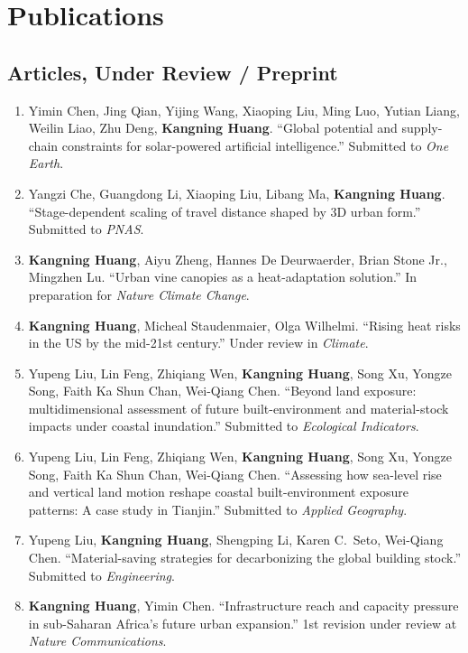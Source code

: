 \documentclass[11pt,letterpaper]{article}
\begin{document}
\section{Publications}

\subsection{Articles, Under Review / Preprint}
\begin{enumerate}
  \item Yimin Chen, Jing Qian, Yijing Wang, Xiaoping Liu, Ming Luo, Yutian Liang, Weilin Liao, Zhu Deng, \textbf{Kangning Huang}. ``Global potential and supply-chain constraints for solar-powered artificial intelligence.'' Submitted to \textit{One Earth}.
  \item Yangzi Che, Guangdong Li, Xiaoping Liu, Libang Ma, \textbf{Kangning Huang}. ``Stage-dependent scaling of travel distance shaped by 3D urban form.'' Submitted to \textit{PNAS}.
  \item \textbf{Kangning Huang}, Aiyu Zheng, Hannes De Deurwaerder, Brian Stone Jr., Mingzhen Lu. ``Urban vine canopies as a heat-adaptation solution.'' In preparation for \textit{Nature Climate Change}.
  \item \textbf{Kangning Huang}, Micheal Staudenmaier, Olga Wilhelmi. ``Rising heat risks in the US by the mid-21st century.'' Under review in \textit{Climate}.
  \item Yupeng Liu, Lin Feng, Zhiqiang Wen, \textbf{Kangning Huang}, Song Xu, Yongze Song, Faith Ka Shun Chan, Wei-Qiang Chen. ``Beyond land exposure: multidimensional assessment of future built-environment and material-stock impacts under coastal inundation.'' Submitted to \textit{Ecological Indicators}.
  \item Yupeng Liu, Lin Feng, Zhiqiang Wen, \textbf{Kangning Huang}, Song Xu, Yongze Song, Faith Ka Shun Chan, Wei-Qiang Chen. ``Assessing how sea-level rise and vertical land motion reshape coastal built-environment exposure patterns: A case study in Tianjin.'' Submitted to \textit{Applied Geography}.
  \item Yupeng Liu, \textbf{Kangning Huang}, Shengping Li, Karen C.\ Seto, Wei-Qiang Chen. ``Material-saving strategies for decarbonizing the global building stock.'' Submitted to \textit{Engineering}.
  \item \textbf{Kangning Huang}, Yimin Chen. ``Infrastructure reach and capacity pressure in sub-Saharan Africa's future urban expansion.'' 1st revision under review at \textit{Nature Communications}.
\end{enumerate}
\end{document}
